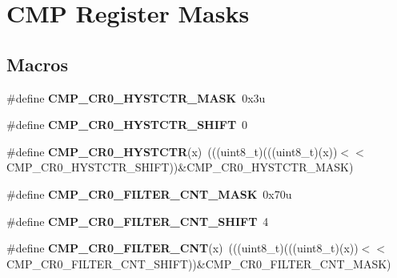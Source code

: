 \hypertarget{group___c_m_p___register___masks}{}\section{C\+MP Register Masks}
\label{group___c_m_p___register___masks}
\subsection*{Macros}
\begin{DoxyCompactItemize}
\item 
\mbox{\label{group___c_m_p___register___masks_ga9a81a95d8ceda15abb107f3c961e2f03}} 
\#define {\bfseries C\+M\+P\+\_\+\+C\+R0\+\_\+\+H\+Y\+S\+T\+C\+T\+R\+\_\+\+M\+A\+SK}~0x3u
\item 
\mbox{\label{group___c_m_p___register___masks_ga12a965eae39b79d9e6066de9af418df3}} 
\#define {\bfseries C\+M\+P\+\_\+\+C\+R0\+\_\+\+H\+Y\+S\+T\+C\+T\+R\+\_\+\+S\+H\+I\+FT}~0
\item 
\mbox{\label{group___c_m_p___register___masks_ga78eaf28aa2956818501310daaeffca74}} 
\#define {\bfseries C\+M\+P\+\_\+\+C\+R0\+\_\+\+H\+Y\+S\+T\+C\+TR}(x)~(((uint8\+\_\+t)(((uint8\+\_\+t)(x))$<$$<$C\+M\+P\+\_\+\+C\+R0\+\_\+\+H\+Y\+S\+T\+C\+T\+R\+\_\+\+S\+H\+I\+FT))\&C\+M\+P\+\_\+\+C\+R0\+\_\+\+H\+Y\+S\+T\+C\+T\+R\+\_\+\+M\+A\+SK)
\item 
\mbox{\label{group___c_m_p___register___masks_gab1e98c122818fe880217f72fab932ac2}} 
\#define {\bfseries C\+M\+P\+\_\+\+C\+R0\+\_\+\+F\+I\+L\+T\+E\+R\+\_\+\+C\+N\+T\+\_\+\+M\+A\+SK}~0x70u
\item 
\mbox{\label{group___c_m_p___register___masks_ga07a4d57ab7d44b55b3d73f612aa7dd98}} 
\#define {\bfseries C\+M\+P\+\_\+\+C\+R0\+\_\+\+F\+I\+L\+T\+E\+R\+\_\+\+C\+N\+T\+\_\+\+S\+H\+I\+FT}~4
\item 
\mbox{\label{group___c_m_p___register___masks_ga1f6d81f303672acd661263de6da7ea13}} 
\#define {\bfseries C\+M\+P\+\_\+\+C\+R0\+\_\+\+F\+I\+L\+T\+E\+R\+\_\+\+C\+NT}(x)~(((uint8\+\_\+t)(((uint8\+\_\+t)(x))$<$$<$C\+M\+P\+\_\+\+C\+R0\+\_\+\+F\+I\+L\+T\+E\+R\+\_\+\+C\+N\+T\+\_\+\+S\+H\+I\+FT))\&C\+M\+P\+\_\+\+C\+R0\+\_\+\+F\+I\+L\+T\+E\+R\+\_\+\+C\+N\+T\+\_\+\+M\+A\+SK)

\end{DoxyCompactItemize}
